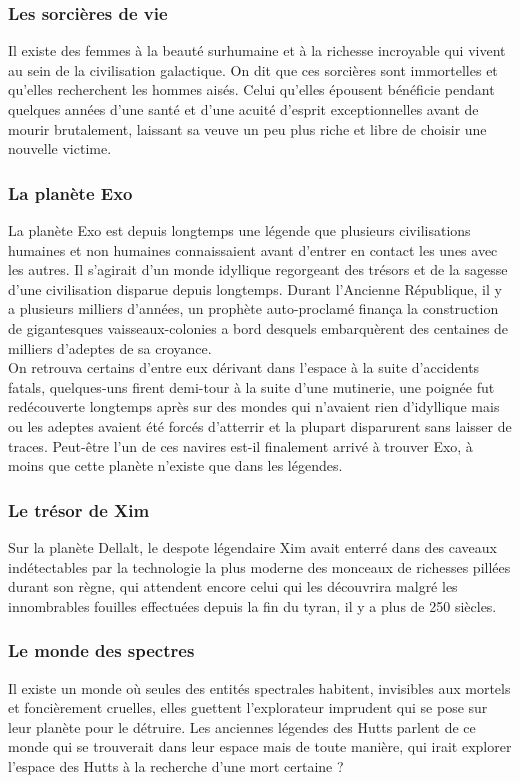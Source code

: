 \documentclass[twoside]{article}
\begin{document}
\subsubsection{Les sorcières de vie}
Il existe des femmes à la beauté surhumaine et à la richesse incroyable qui vivent au sein de la civilisation galactique. On dit que ces sorcières sont immortelles et qu'elles recherchent les hommes aisés. Celui qu'elles épousent bénéficie pendant quelques années d'une santé et d'une acuité d'esprit exceptionnelles avant de mourir brutalement, laissant sa veuve un peu plus riche et libre de choisir une nouvelle victime.

\subsubsection{La planète Exo}
La planète Exo est depuis longtemps une légende que plusieurs civilisations humaines et non humaines connaissaient avant d'entrer en contact les unes avec les autres. Il s'agirait d'un monde idyllique regorgeant des trésors et de la sagesse d'une civilisation disparue depuis longtemps. Durant l'Ancienne République, il y a plusieurs milliers d'années, un prophète auto-proclamé finança la construction de gigantesques vaisseaux-colonies a bord desquels embarquèrent des centaines de milliers d'adeptes de sa croyance.\\

On retrouva certains d'entre eux dérivant dans l'espace à la suite d'accidents fatals, quelques-uns firent demi-tour à la suite d'une mutinerie, une poignée fut redécouverte longtemps après sur des mondes qui n'avaient rien d'idyllique mais ou les adeptes avaient été forcés d'atterrir et la plupart disparurent sans laisser de traces. Peut-être l'un de ces navires  est-il finalement arrivé à trouver Exo, à moins que cette planète n'existe que dans les légendes.

\subsubsection{Le trésor de Xim}
Sur la planète Dellalt, le despote légendaire Xim avait enterré dans des caveaux indétectables par la technologie la plus moderne des monceaux de richesses pillées durant son règne, qui attendent encore celui qui les découvrira malgré les innombrables fouilles effectuées depuis la fin du tyran, il y a plus de 250 siècles.

\subsubsection{Le monde des spectres}
Il existe un monde où seules des entités spectrales habitent, invisibles aux mortels et foncièrement cruelles, elles guettent l'explorateur imprudent qui se pose sur leur planète pour le détruire. Les anciennes légendes des Hutts parlent de ce monde qui se trouverait dans leur espace mais de toute manière, qui irait explorer l'espace des Hutts à la recherche d'une mort certaine ?
\end{document}
